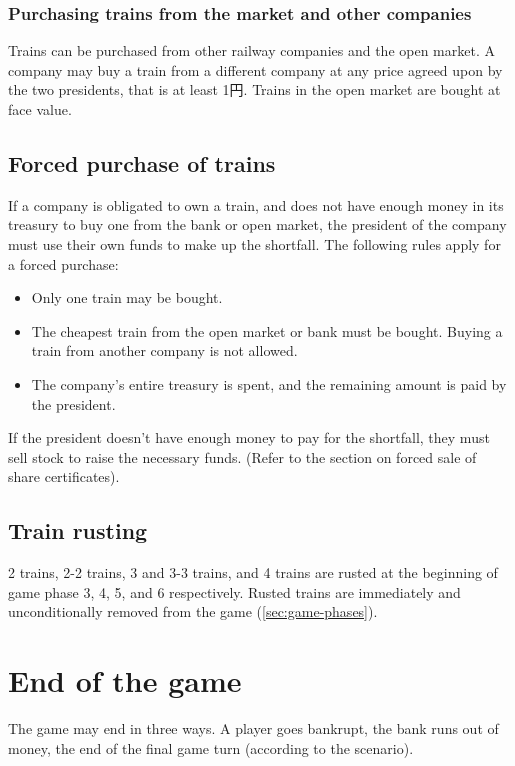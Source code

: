 \documentclass{article}
\begin{document}
\begin{CJK}{UTF8}{min}
\begin{multicols}{2}
\subsubsection{Purchasing trains from the market and other companies}

Trains can be purchased from other railway companies and the open
market.  A company may buy a train from a different company at any
price agreed upon by the two presidents, that is at least 1円. Trains
in the open market are bought at face value.

\subsection{Forced purchase of trains}
If a company is obligated to own a train, and does not have enough
money in its treasury to buy one from the bank or open market, the
president of the company must use their own funds to make up the
shortfall. The following rules apply for a forced purchase:

\begin{itemize}
\item Only one train may be bought.
\item The cheapest train from the open market or bank must be
  bought. Buying a train from another company is not allowed.
\item The company's entire treasury is spent, and the remaining amount
  is paid by the president.
\end{itemize}

If the president doesn't have enough money to pay for the shortfall,
they must sell stock to raise the necessary funds. (Refer to the
section on forced sale of share certificates).

\subsection{Train rusting}

2 trains, 2-2 trains, 3 and 3-3 trains, and 4 trains are rusted at the
beginning of game phase 3, 4, 5, and 6 respectively. Rusted trains are
immediately and unconditionally removed from the game
(\autoref{sec:game-phases}).


\section{End of the game}

The game may end in three ways. A player goes bankrupt, the bank runs
out of money, the end of the final game turn (according to the
scenario).


\end{multicols}
\end{CJK}
\end{document}
